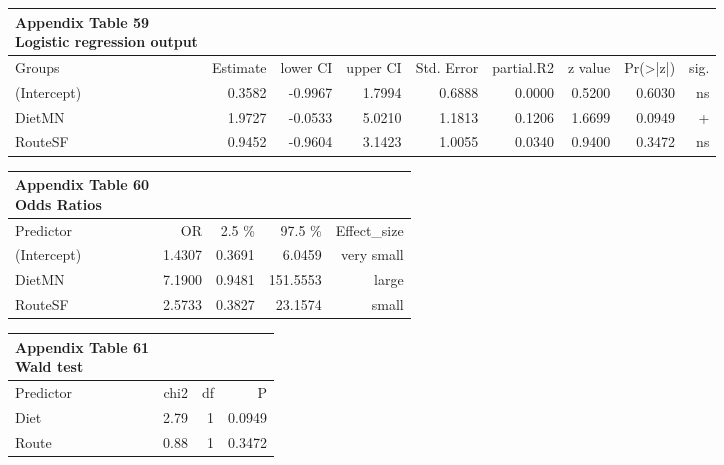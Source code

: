\documentclass[
  12pt,
  letterpaper,
]{article}
\begin{document}
\begingroup
\fontsize{12.0pt}{14.4pt}\selectfont
\begin{longtable}{l|rrrrrrrr}
\caption*{
{\large \textbf{Appendix Table 59}} \\ 
{\small \textbf{Logistic regression output}}
} \\ 
\toprule
Groups & {Estimate} & {lower CI} & {upper CI} & {Std. Error} & {partial.R2} & {z value} & {Pr(>|z|)} & {sig.} \\ 
\midrule\addlinespace[2.5pt]
(Intercept) & 0.3582 & -0.9967 & 1.7994 & 0.6888 & 0.0000 & 0.5200 & 0.6030 & ns \\ 
DietMN & 1.9727 & -0.0533 & 5.0210 & 1.1813 & 0.1206 & 1.6699 & 0.0949 & + \\ 
RouteSF & 0.9452 & -0.9604 & 3.1423 & 1.0055 & 0.0340 & 0.9400 & 0.3472 & ns \\ 
\bottomrule
\end{longtable}
\endgroup

\begingroup
\fontsize{12.0pt}{14.4pt}\selectfont
\begin{longtable}{l|rrrr}
\caption*{
{\large \textbf{Appendix Table 60}} \\ 
{\small \textbf{Odds Ratios}}
} \\ 
\toprule
Predictor & {OR} & 2.5 \% & 97.5 \% & Effect\_size \\ 
\midrule\addlinespace[2.5pt]
(Intercept) & 1.4307 & 0.3691 & 6.0459 & very small \\ 
DietMN & 7.1900 & 0.9481 & 151.5553 & large \\ 
RouteSF & 2.5733 & 0.3827 & 23.1574 & small \\ 
\bottomrule
\end{longtable}
\endgroup

\begingroup
\fontsize{12.0pt}{14.4pt}\selectfont
\begin{longtable}{l|rrr}
\caption*{
{\large \textbf{Appendix Table 61}} \\ 
{\small \textbf{Wald test}}
} \\ 
\toprule
Predictor & {chi2} & {df} & {P} \\ 
\midrule\addlinespace[2.5pt]
Diet & 2.79 & 1 & 0.0949 \\ 
Route & 0.88 & 1 & 0.3472 \\ 
\bottomrule
\end{longtable}
\endgroup
\end{document}
